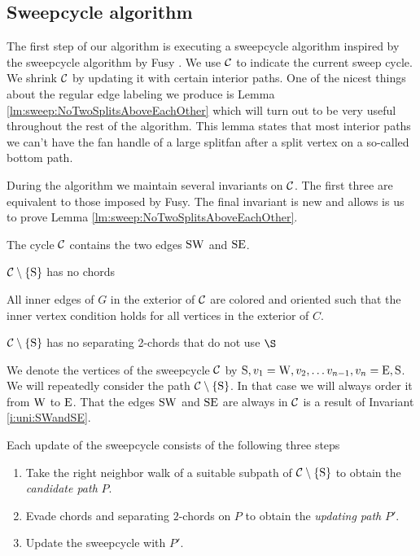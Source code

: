 
\subsection{Sweepcycle algorithm}
\thispagestyle{plain}
  \label{ss:sweep}
  The first step of our algorithm is executing a sweepcycle algorithm inspired by the sweepcycle algorithm by Fusy \cite{Fusy2006}. We use $\mathcal{C}$ to indicate the current sweep cycle. We shrink $\mathcal{C}$ by updating it with certain interior paths.
  One of the nicest things about the regular edge labeling we produce is Lemma \ref{lm:sweep:NoTwoSplitsAboveEachOther} which will turn out to be very useful throughout the rest of the algorithm. This lemma states that most interior paths we can't have the fan handle of a large splitfan after a split vertex on a so-called bottom path. 

  During the algorithm we maintain several invariants on $\mathcal{C}$. The first three are equivalent to those imposed by Fusy. The final invariant is new and allows is us to prove Lemma \ref{lm:sweep:NoTwoSplitsAboveEachOther}.

  \begin{invariants}
    \itemsep=-4pt

    \item \label{i:uni:SWandSE} The cycle $\mathcal{C}$ contains the two edges $\mathrm{S} \mathrm{W}$ and $\mathrm{S} \mathrm{E}$.
    \item \label{i:uni:noChords} $\mathcal{C} \setminus \left\lbrace {\mathrm{S}} \right\rbrace$ has no chords
    \item \label{i:uni:intVertCond} All inner edges of $G$ in the exterior of $\mathcal{C}$ are colored and oriented such that the inner vertex condition holds for all vertices in the exterior of $C$.
    \item \label{i:uni:no2Chords} $\mathcal{C}\setminus \left\lbrace {\mathrm{S}} \right\rbrace$ has no separating 2-chords that do not use $\S$
  \end{invariants}

  We denote the vertices of the sweepcycle $\mathcal{C}$ by $\mathrm{S}, v_1 = \mathrm{W}, v_2, \ldots v_{n-1}, v_n = \mathrm{E}, \mathrm{S}$.   We will repeatedly consider the path $\mathcal{C} \setminus \left\lbrace {\mathrm{S}} \right\rbrace$. In that case we will always order it from $\mathrm{W}$ to $\mathrm{E}$. That the edges $\mathrm{S} \mathrm{W}$ and $\mathrm{S} \mathrm{E}$ are always in $\mathcal{C}$ is a result of Invariant \ref{i:uni:SWandSE}.


  Each update of the sweepcycle consists of the following three steps
  \begin{enumerate}
    \itemsep=-4pt
    \item Take the right neighbor walk of a suitable subpath of $\mathcal{C} \setminus \left\lbrace {\mathrm{S}} \right\rbrace$ to obtain the \emph{candidate path} $P$.
    \item Evade chords and separating $2$-chords on $P$ to obtain the \emph{updating path} $P'$.
    \item Update the sweepcycle with $P'$.
  \end{enumerate}

